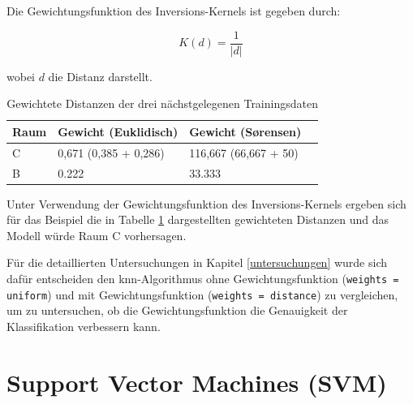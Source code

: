 Die Gewichtungsfunktion des Inversions-Kernels ist gegeben durch:

\begin{equation}
    \label{eq:inversion}
    K(d) = \frac{1}{|d|}
\end{equation}

wobei \( d \) die Distanz darstellt. 




\begin{table}[h]
    \centering
    \begin{tabularx}{\textwidth}{|X|X|X|X|}
        \hline
        Raum & Gewicht (Euklidisch) & Gewicht (Sørensen) \\ \hline
        C & 0,671 (0,385 + 0,286) & 116,667 (66,667 + 50) \\ \hline
        B & 0.222 & 33.333 \\ \hline
    \end{tabularx}
    \caption{Gewichtete Distanzen der drei nächstgelegenen Trainingsdaten}
    \label{tab:gewichtete_distanzen}
\end{table}

Unter Verwendung der Gewichtungsfunktion des Inversions-Kernels ergeben sich für das Beispiel die in Tabelle \ref{tab:gewichtete_distanzen} dargestellten gewichteten Distanzen und das Modell würde Raum C vorhersagen.

Für die detaillierten Untersuchungen in Kapitel \ref{untersuchungen} wurde sich dafür entscheiden den \gls{knn}-Algorithmus ohne Gewichtungsfunktion (\texttt{weights = uniform}) und mit Gewichtungsfunktion (\texttt{weights = distance}) zu vergleichen, um zu untersuchen, ob die Gewichtungsfunktion die Genauigkeit der Klassifikation verbessern kann.

\section{Support Vector Machines (SVM)}


